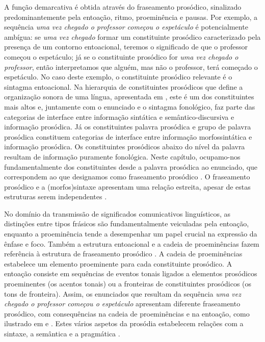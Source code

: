 \documentclass[output=paper,colorlinks,citecolor=brown,booklanguage=portuguese]{langscibook}
\begin{document}
A função demarcativa é obtida através do fraseamento prosódico, sinalizado predominantemente pela entoação, ritmo, proeminência e pausas. Por exemplo, a sequência \emph{uma vez chegado o professor começou o espetáculo} é potencialmente ambígua: se \emph{uma vez chegado} formar um constituinte prosódico caracterizado pela presença de um contorno entoacional, teremos o significado de que o professor começou o espetáculo; já se o constituinte prosódico for \emph{uma vez chegado o professor}, então interpretamos que alguém, mas não o professor, terá começado o espetáculo. No caso deste exemplo, o constituinte prosódico relevante é o sintagma entoacional. Na hierarquia de constituintes prosódicos que define a organização sonora de uma língua, apresentada em , este é um dos constituintes mais altos e, juntamente com o enunciado e o sintagma fonológico, faz parte das categorias de interface entre informação sintática e semântico-discursiva e informação prosódica. Já os constituintes palavra prosódica e grupo de palavra prosódica constituem categorias de interface entre informação morfossintática e informação prosódica. Os constituintes prosódicos abaixo do nível da palavra resultam de informação puramente fonológica. Neste capítulo, ocupamo-nos fundamentalmente dos constituintes desde a palavra prosódica ao enunciado, que correspondem ao que designamos como fraseamento prosódico \citep{Frota2000, Vigario2003, Frota2003}. O fraseamento prosódico e a (morfos)sintaxe apresentam uma relação estreita, apesar de estas estruturas serem independentes \citep{Nespor2007}. 


No domínio da transmissão de significados comunicativos linguísticos, as distinções entre tipos frásicos são fundamentalmente veiculadas pela entoação, enquanto a proeminência tende a desempenhar um papel crucial na expressão da ênfase e foco. Também a estrutura entoacional e a cadeia de proeminências fazem referência à estrutura de fraseamento prosódico \citep{Frota2000, Ladd2008}. A cadeia de proeminências estabelece um elemento proeminente para cada constituinte prosódico. A entoação consiste em sequências de eventos tonais ligados a elementos prosódicos proeminentes (os acentos tonais) ou a fronteiras de constituintes prosódicos (os tons de fronteira). Assim, os enunciados que resultam da sequência \emph{uma vez chegado o professor começou o espetáculo} apresentam diferente fraseamento prosódico, com consequências na cadeia de proeminências e na entoação, como ilustrado em  e . Estes vários aspetos da prosódia estabelecem relações com a sintaxe, a semântica e a pragmática \citep{Wagner2010}.  
\end{document}
